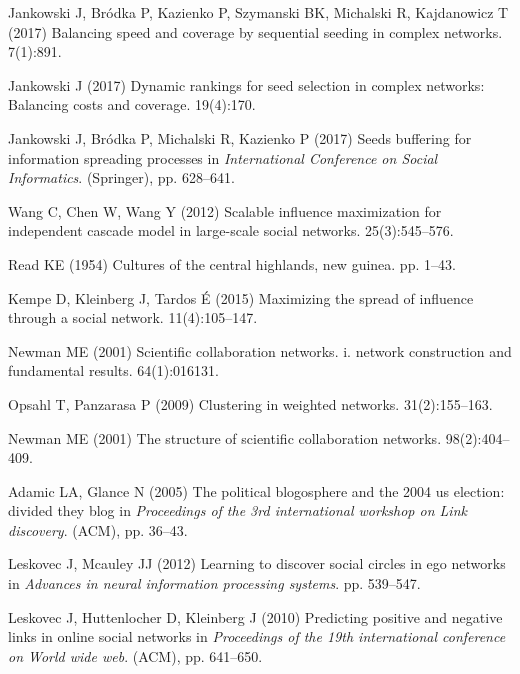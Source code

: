 \documentclass[11pt]{article} %
\begin{document}
\begin{thebibliography}{10}
Jankowski J, Br{\'o}dka P, Kazienko P, Szymanski BK, Michalski R, Kajdanowicz T (2017) Balancing speed and coverage by sequential seeding in complex networks. 
 7(1):891.

Jankowski J (2017) Dynamic rankings for seed selection in complex networks:
  Balancing costs and coverage.
 19(4):170.

Jankowski J, Br{\'o}dka P, Michalski R, Kazienko P (2017) Seeds buffering for
  information spreading processes in {\em International Conference on Social
  Informatics}.
\newblock (Springer), pp. 628--641.

Wang C, Chen W, Wang Y (2012) Scalable influence maximization for independent
  cascade model in large-scale social networks.
 25(3):545--576.

Read KE (1954) Cultures of the central highlands, new guinea.
 pp. 1--43.

Kempe D, Kleinberg J, Tardos {\'E} (2015) Maximizing the spread of influence
  through a social network.
 11(4):105--147.

Newman ME (2001) Scientific collaboration networks. i. network construction and
  fundamental results.
 64(1):016131.

Opsahl T, Panzarasa P (2009) Clustering in weighted networks.
 31(2):155--163.

Newman ME (2001) The structure of scientific collaboration networks.
 98(2):404--409.

Adamic LA, Glance N (2005) The political blogosphere and the 2004 us election:
  divided they blog in {\em Proceedings of the 3rd international workshop on
  Link discovery}.
\newblock (ACM), pp. 36--43.

Leskovec J, Mcauley JJ (2012) Learning to discover social circles in ego
  networks in {\em Advances in neural information processing systems}.
\newblock pp. 539--547.

Leskovec J, Huttenlocher D, Kleinberg J (2010) Predicting positive and negative
  links in online social networks in {\em Proceedings of the 19th international
  conference on World wide web}.
\newblock (ACM), pp. 641--650.

\end{thebibliography}
\end{document}
